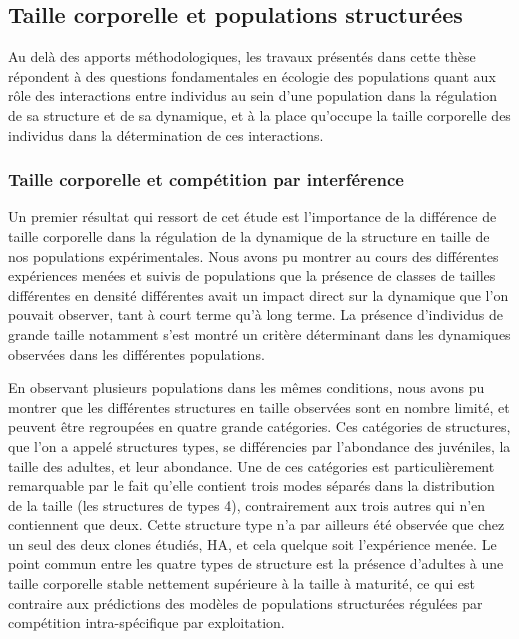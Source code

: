 \subsection{Taille corporelle et populations structurées}

Au delà des apports méthodologiques, les travaux présentés dans cette thèse
répondent à des questions fondamentales en écologie des populations quant aux
rôle des interactions entre individus au sein d'une population dans la
régulation de sa structure et de sa dynamique, et à la place qu'occupe la taille
corporelle des individus dans la détermination de ces interactions.

\subsubsection{Taille corporelle et compétition par interférence}

Un premier résultat qui ressort de cet étude est l'importance de la différence
de taille corporelle dans la régulation de la dynamique de la structure en
taille de nos populations expérimentales. Nous avons pu montrer au cours des
différentes expériences menées et suivis de populations que la présence de
classes de tailles différentes en densité différentes avait un impact direct sur
la dynamique que l'on pouvait observer, tant à court terme qu'à long terme. La
présence d'individus de grande taille notamment s'est montré un critère
déterminant dans les dynamiques observées dans les différentes populations. 

En observant plusieurs populations dans les mêmes conditions, nous avons pu
montrer que les différentes structures en taille observées sont en nombre
limité, et peuvent être regroupées en quatre grande catégories. Ces catégories
de structures, que l'on a appelé structures types, se différencies par
l'abondance des juvéniles, la taille des adultes, et leur abondance. Une de ces
catégories est particulièrement remarquable par le fait qu'elle contient trois
modes séparés dans la distribution de la taille (les structures de types 4),
contrairement aux trois autres qui n'en contiennent que deux. Cette structure
type n'a par ailleurs été observée que chez un seul des deux clones étudiés, HA,
et cela quelque soit l'expérience menée. Le point commun entre les quatre
types de structure est la présence d'adultes à une taille corporelle stable
nettement supérieure à la taille à maturité, ce qui est contraire aux
prédictions des modèles de populations structurées régulées par compétition
intra-spécifique par exploitation.

